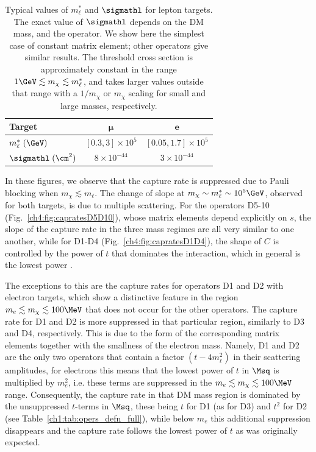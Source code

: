 \begin{table}[t!bp]
    \centering
    \begin{tabular}{l c c}
    \toprule
    \bf Target & $\bm{\mu}$ & $\bm{e}$  \\
    \midrule
    $m_\ell^*\; (\GeV)$  & $[0.3,3] \times 10^{5}$ & $[0.05,1.7] \times 10^{5}$  \\
    $\sigmathl\; (\cm^2)$ &  $8\times 10^{-44}$ & $3\times 10^{-44}$ \\
    \bottomrule
    \end{tabular} 
    \caption{Typical values of $m_\ell^*$ and $\sigmathl$ for lepton targets. 
    The exact value of $\sigmathl$ depends on the DM mass, and the operator. We show  here the simplest case of constant matrix element; other operators give similar results. The threshold cross section is approximately constant in the range $1\GeV\lesssim m_\chi\lesssim m_\ell^*$, and takes larger values outside that range with a $1/m_\chi$ or $m_\chi$ scaling for small and large masses, respectively. }
    \label{ch4:tab:mstarsigma}
    \end{table} 

In these figures, we observe that the capture rate is suppressed due to Pauli blocking when $m_\chi \lesssim m_\ell$. The change of slope at $m_\chi\sim m_\ell^* \sim 10^5\GeV$, observed for both targets, is due to multiple scattering. 
For the operators D5-10 (Fig.~\ref{ch4:fig:capratesD5D10}), whose matrix elements depend explicitly on $s$,  the slope of the capture rate in the three mass regimes are all very similar to one another, while for D1-D4 (Fig.~\ref{ch4:fig:capratesD1D4}), the shape of $C$ is controlled by the power of $t$ that dominates the interaction, which in general is the lowest power \cite{Bell:2020jou_sep_ImprovedTreatmentDark}. 

The exceptions to this are the capture rates for operators D1 and D2 with electron targets, which show a distinctive feature in the region $m_e\lesssim m_\chi\lesssim 100\MeV$ that does not occur for the other operators.  
The capture rate for D1 and D2 is more suppressed in that particular region, similarly to D3 and D4, respectively. This is due to the form of the corresponding matrix elements together with the smallness of the electron mass. Namely, 
D1 and D2 are the only two operators that contain a factor $(t-4 m_\ell^2)$ in their scattering amplitudes, for electrons this means that the lowest power of $t$ in $\Msq$ is multiplied by $m_e^2$, i.e. these terms are suppressed in the $m_e \lesssim m_\chi\lesssim 100\MeV$ range. Consequently, the capture rate in that DM mass region is dominated by the unsuppressed $t$-terms  in $\Msq$, these being $t$  for D1 (as for D3) and $t^2$ for D2 (see Table~\ref{ch1:tab:opers_defn_full}), while below $m_e$ this additional suppression disappears and the capture rate follows the lowest power of $t$ as was originally expected. 

